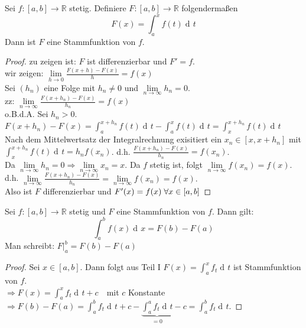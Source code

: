 \documentclass[a4paper,titlepage,oneside]{article}
\def\R{\ensuremath{\mathbb{R}} }
\newcommand{\der}{\operatorname{d\!}{}}
\def\sp{\hspace{0,1cm}}
\renewcommand{\liminf}[2][n]{\ensuremath{\lim\limits_{#1 \rightarrow \infty}{#2}}}
\newcommand{\limnull}[2][n]{\ensuremath{\lim\limits_{#1 \rightarrow 0}{#2}}}
\newcommand{\integral}[4][x]{\ensuremath{\int_{#2}^{#3}{#4\der #1}}}
\newcommand{\intAB}[2][x]{\integral[#1]{a}{b}{#2}}
\theoremstyle{thmstyle}
\begin{document}
\begin{prop}
Sei $f: [a,b] \to \R$ stetig. Definiere $F: [a,b] \to \R$ folgendermaßen
\[F(x) = \int_{a}^{x}{f(t)\der t}\]
Dann ist $F$ eine Stammfunktion von $f$.
\begin{proof}
zu zeigen ist: $F$ ist differenzierbar und $F' = f$.\\
wir zeigen: $\limnull[h]{\frac{F(x+h) - F(x)}{h}} = f(x)$\\
Sei $(h_n)$ eine Folge mit $h_n \ne 0$ und $\liminf{h_n} = 0.$\\
zz: $ \liminf{\frac{F(x+h_n) - F(x)}{h_n}} = f(x)$\\
o.B.d.A. Sei $h_n > 0$.\\
$F(x+h_n) - F(x) = \int_{a}^{x+h_n}{f(t)\der t} - \int_{a}^{x}{f(t)\der t} = \int_{x}^{x+h_n}{f(t)\der t}$\\
Nach dem Mittelwertsatz der Integralrechnung exisitiert ein $x_n \in [x, x+ h_n]$ mit $\int_{x}^{x+h_n}{f(t)\der t} = h_n f(x_n)$.
d.h. $\frac{F(x+h_n) - F(x)}{h_n} = f(x_n)$.\\
Da $ \liminf{h_n} = 0 \Rightarrow \liminf{x_n} = x.$ Da $f$ stetig ist, folgt $\liminf{f(x_n)} = f(x)$. d.h. $\liminf{\frac{F(x+h_n) - F(x)}{h_n}} = \liminf{f(x_n)} = f(x).$\\
Also ist $F$ differenzierbar und $F'(x) = f(x) \sp \forall x \in [a,b]$
\end{proof}
\end{prop}

\begin{satz}
Sei $f: [a,b] \to \R$ stetig und $F$ eine Stammfunktion von $f$. Dann gilt: \[ \intAB{f(x)} = F(b) - F(a)\]
Man schreibt: $F|_a^b = F(b) - F(a)$
\begin{proof}
Sei $x \in [a,b]$. Dann folgt aus Teil I $F(x) = \int_{a}^{x}{f_t \der t}$ ist Stammfunktion von $f$.\\
$\Rightarrow F(x) = \int_{a}^{x}{f_t \der t} + c \quad $mit $c$ Konstante\\
$\Rightarrow F(b) - F(a) = \int_{a}^{b}{f_t \der t} + c - \underbrace{\int_{a}^{a}{f_t \der t}}_{= 0} - c = \int_{a}^{b}{f_t \der t}$.
\end{proof}
\end{satz}
\end{document}
